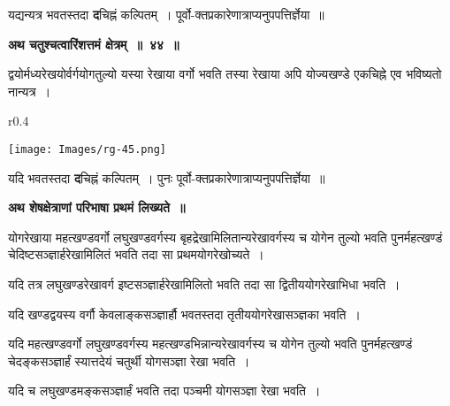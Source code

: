 \documentclass[11pt, openany]{book}
\begin{document}
यद्यन्यत्र भवतस्तदा \textbf{द}चिह्नं कल्पितम्~। पूर्वो-क्तप्रकारेणात्राप्यनुपपत्तिर्ज्ञेया~॥ 
\vspace{2mm}

\begin{center}
\textbf{\large अथ चतुश्चत्वारिंशत्तमं क्षेत्रम्~॥~४४~॥}
\end{center}

{\ab द्वयोर्मध्यरेखयोर्वर्गयोगतुल्यो यस्या रेखाया वर्गो भवति तस्या रेखाया अपि योज्यखण्डे एकचिह्ने एव भविष्यतो नान्यत्र~। }\\

\begin{wrapfigure}{r}{0.4\textwidth}
\vspace{-12mm}
\begin{center}
\texttt{[image: Images/rg-45.png]}
\end{center}
\vspace{-8mm}
\end{wrapfigure}

 यदि भवतस्तदा \textbf{द}चिह्नं कल्पितम्~। पुनः पूर्वो-क्तप्रकारेणात्राप्यनुपपत्तिर्ज्ञेया~॥ 
\vspace{2mm}

\begin{center}
\textbf{\large अथ शेषक्षेत्राणां परिभाषा प्रथमं लिख्यते~॥ }
\end{center}

 योगरेखाया महत्खण्डवर्गो लघुखण्डवर्गस्य बृहद्रेखामिलितान्यरेखावर्गस्य च योगेन तुल्यो भवति पुनर्महत्खण्डं चेदिष्टसञ्ज्ञार्हरेखामिलितं भवति तदा सा प्रथमयोगरेखोच्यते~। \\
\vspace{-2mm}

 यदि तत्र लघुखण्डरेखावर्ग इष्टसञ्ज्ञार्हरेखामिलितो भवति तदा सा द्वितीययोगरेखाभिधा भवति~। \\
\vspace{-2mm}

यदि खण्डद्वयस्य वर्गौ केवलाङ्कसञ्ज्ञार्हौ भवतस्तदा तृतीययोगरेखासञ्ज्ञका भवति~। \\
\vspace{-2mm}

 यदि महत्खण्डवर्गो लघुखण्डवर्गस्य महत्खण्डभिन्नान्यरेखावर्गस्य च योगेन तुल्यो भवति पुनर्महत्खण्डं चेदङ्कसञ्ज्ञार्हं स्यात्तदेयं चतुर्थी योगसञ्ज्ञा रेखा भवति~। \\
\vspace{-2mm}

 यदि च लघुखण्डमङ्कसञ्ज्ञार्हं भवति तदा पञ्चमी योगसञ्ज्ञा रेखा भवति~।

\newpage
\end{document}
